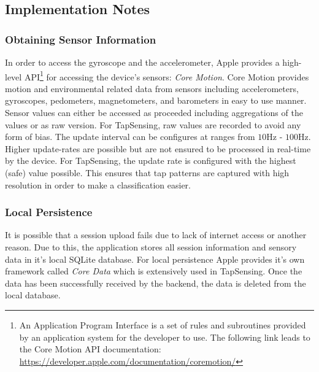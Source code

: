 

\subsection{Implementation Notes}
\subsubsection{Obtaining Sensor Information}
In order to access the gyroscope and the accelerometer, Apple provides a high-level API\footnote{An Application Program Interface is a set of rules and subroutines provided by an application system for the developer to use. The following link leads to the Core Motion API documentation: \url{https://developer.apple.com/documentation/coremotion/} } for accessing the device's sensors: \textit{Core Motion}. Core Motion provides motion and environmental related data from sensors including accelerometers, gyroscopes, pedometers, magnetometers, and barometers in easy to use manner. \\

Sensor values can either be accessed as proceeded including aggregations of the values or as raw version. For TapSensing, raw values are recorded to avoid any form of bias. The update interval can be configures at ranges from $10$Hz - $100$Hz. Higher update-rates are possible but are not ensured to be processed in real-time by the device. For TapSensing, the update rate is configured with the highest (safe) value possible. This ensures that tap patterns are captured with high resolution in order to make a classification easier.
\subsubsection{Local Persistence}
It is possible that a session upload fails due to lack of internet access or another reason. Due to this, the application stores all session information and sensory data in it's local SQLite database. For local persistence Apple provides it's own framework called \textit{Core Data} which is extensively used in TapSensing. Once the data has been successfully received by the backend, the data is deleted from the local database.
